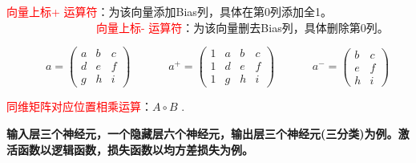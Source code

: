 \begin{definition}
\textcolor{red}{向量上标+ 运算符}：为该向量添加Bias列，具体在第0列添加全1。\\
\textcolor{red}{~~~~~~~~~~~~~~~~向量上标- 运算符}：为该向量删去Bias列，具体删除第0列。
\end{definition}
\begin{example}
~~~~~~~$a = \left(
 \begin{matrix}
   a & b & c \\
   d & e & f \\
   g & h & i
  \end{matrix}
  \right) $~~~~~~
  $a^+ = \left(
\begin{matrix}
   1 & a & b & c \\
   1 & d & e & f \\
   1 & g & h & i
  \end{matrix}
  \right) $~~~~~~
  $a^- = \left(
\begin{matrix}
    b & c \\
    e & f \\
    h & i
  \end{matrix}
  \right) $
\end{example}
\begin{definition}
\textcolor{red}{同维矩阵对应位置相乘运算}：$A\circ B$ .
\end{definition}
\textbf{输入层三个神经元，一个隐藏层六个神经元，输出层三个神经元(三分类)为例。激活函数以逻辑函数，损失函数以均方差损失为例。}

